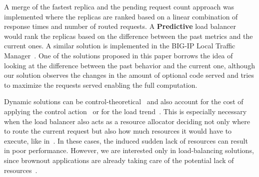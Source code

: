 A merge of the fastest replica and the pending request count approach
was implemented where the replicas are ranked based on a linear
combination of response times and number of routed requests. A
\textbf{Predictive} load balancer would rank the replicas based on the
difference between the past metrics and the current ones. A similar
solution is implemented in the BIG-IP Local Traffic
Manager~\cite{BIGIP}. One of the solutions proposed in this paper
borrows the idea of looking at the difference between the past
behavior and the current one, although our solution observes the
changes in the amount of optional code served and tries to maximize
the requests served enabling the full computation.

Dynamic solutions can be
control-theoretical~\cite{multipathctlb,comparisonstaticdynamic} and
also account for the cost of applying the control
action~\cite{costofcontrol} or for the load trend~\cite{CasolariSA}.
This is especially necessary when the load balancer also acts as a
resource allocator deciding not only where to route the current
request but also how much resources it would have to execute, like
in~\cite{Ardagnaalltogether}. In these cases, the induced sudden lack
of resources can result in poor performance. However, we are
interested only in load-balancing solutions, since brownout
applications are already taking care of the potential lack of
resources~\cite{icse}.
